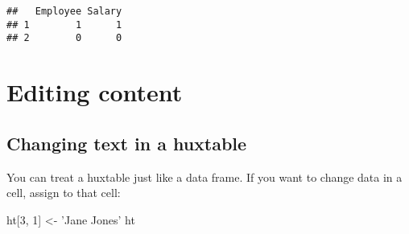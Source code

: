 \documentclass[]{article}
\newenvironment{Shaded}{\begin{snugshade}}{\end{snugshade}}
\newcommand{\DecValTok}[1]{\textcolor[rgb]{0.00,0.00,0.81}{#1}}
\newcommand{\NormalTok}[1]{#1}
\newcommand{\StringTok}[1]{\textcolor[rgb]{0.31,0.60,0.02}{#1}}
\begin{document}
\begin{verbatim}
##   Employee Salary
## 1        1      1
## 2        0      0
\end{verbatim}

\FloatBarrier

\hypertarget{editing-content}{%
\section{Editing content}\label{editing-content}}

\hypertarget{changing-text-in-a-huxtable}{%
\subsection{Changing text in a
huxtable}\label{changing-text-in-a-huxtable}}

You can treat a huxtable just like a data frame. If you want to change
data in a cell, assign to that cell:

\begin{Shaded}
\begin{Highlighting}[]
\NormalTok{ht[}\DecValTok{3}\NormalTok{, }\DecValTok{1}\NormalTok{] <-}\StringTok{ 'Jane Jones'}
\NormalTok{ht}
\end{Highlighting}
\end{Shaded}
\end{document}
